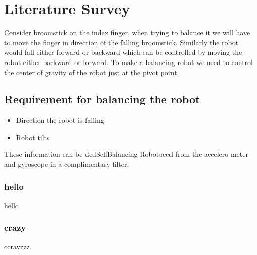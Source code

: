 \documentclass{article}
\begin{document}
	\section{Literature Survey}
	Consider broomstick on the index finger, when trying to balance it we will have to move the finger in direction of the falling broomstick. Similarly the robot would fall either forward or backward which can be controlled by moving the robot either backward or forward.
	To make a balancing robot we need to control the center of gravity of the robot just at the pivot point. 
	\subsection{Requirement for balancing the robot}	
	\begin{itemize}
		\item Direction the robot is falling 
		\item Robot tilts
	\end{itemize}	
	These information can be dedSelfBalancing Robotuced from the accelero-meter and gyroscope in a complimentary filter.
	
	\subsubsection{hello}
	hello
	
	\subsubsection{crazy}
	ccrayzzz
	 
\end{document}
